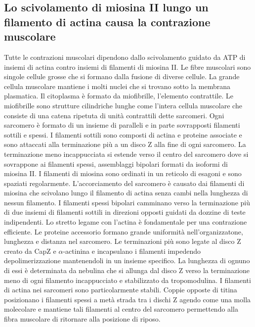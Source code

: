 \subsection{Lo scivolamento di miosina II lungo un filamento di actina causa la contrazione muscolare}
Tutte le contrazioni muscolari dipendono dallo scivolamento guidato da ATP di insiemi di actina contro insiemi di filamenti di miosina II. Le fibre muscolari sono singole cellule grosse
che si formano dalla fusione di diverse cellule. La grande cellula muscolare mantiene i molti nuclei che si trovano sotto la membrana plasmatica. Il citoplasma \`e formato da
miofibrille, l'elemento contrattile. Le miofibrille sono strutture cilindriche lunghe come l'intera cellula muscolare che consiste di una catena ripetuta di unit\`a contrattili dette
sarcomeri. Ogni sarcomero \`e formato di un insieme di paralleli e in parte sovrapposti filamenti sottili e spessi. I filamenti sottili sono composti di actina e proteine associate e 
sono attaccati alla terminazione pi\`u a un disco Z alla fine di ogni sarcomero. La terminazione meno incappucciata si estende verso il centro del sarcomero dove si sovrappone 
ai filamenti spessi, assemblaggi bipolari formati da isoformi di miosina II. I filamenti di miosina sono ordinati in un reticolo di esagoni e sono spaziati regolarmente. L'accorciamento
del sarcomero \`e causato dai filamenti di miosina che scivolano lungo il filamento di actina senza cambi nella lunghezza di nessun filamento. I filamenti spessi bipolari camminano verso
la terminazione pi\`u di due insiemi di filamenti sottili in direzioni opposti guidati da dozzine di teste indipendenti. Lo stretto legame con l'actina \`e fondamentale per una 
contrazione efficiente. Le proteine accessorio formano grande uniformit\`a nell'organizzatone, lunghezza e distanza nel sarcomero. Le terminazioni pi\`u sono legate al disco Z creato 
da CapZ e $\alpha$-actinina e incapsulano i filamenti impedendo depolimerizzazione mantenendoli in un insieme specifico. La lunghezza di ognuno di essi \`e determinata da nebulina
che si allunga dal disco Z verso la terminazione meno di ogni filamento incappucciato e stabilizzato da tropomodulina. I filamenti di actina nei sarcomeri sono particolarmente stabili. 
Coppie opposte di titina posizionano i filamenti spessi a met\`a strada tra i dischi Z agendo come una molla molecolare e mantiene tali filamenti al centro del sarcomero permettendo
alla fibra muscolare di ritornare alla posizione di riposo. 
